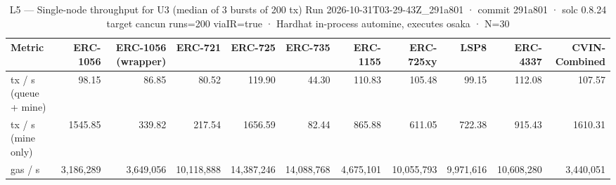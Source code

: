 \begin{table}[ht]
\centering
\small
\begin{tabular}{lrrrrrrrrrr}
\toprule
Metric & ERC-1056 & ERC-1056 (wrapper) & ERC-721 & ERC-725 & ERC-735 & ERC-1155 & ERC-725xy & LSP8 & ERC-4337 & CVIN-Combined \\
\midrule
tx / s (queue + mine) & 98.15 & 86.85 & 80.52 & 119.90 & 44.30 & 110.83 & 105.48 & 99.15 & 112.08 & 107.57 \\
tx / s (mine only) & 1545.85 & 339.82 & 217.54 & 1656.59 & 82.44 & 865.88 & 611.05 & 722.38 & 915.43 & 1610.31 \\
gas / s & 3,186,289 & 3,649,056 & 10,118,888 & 14,387,246 & 14,088,768 & 4,675,101 & 10,055,793 & 9,971,616 & 10,608,280 & 3,440,051 \\
\bottomrule
\end{tabular}
\caption{L5 — Single-node throughput for U3 (median of 3 bursts of 200 tx) Run 2026-10-31T03-29-43Z\_291a801 · commit 291a801 · solc 0.8.24 target cancun runs=200 viaIR=true · Hardhat in-process automine, executes osaka · N=30}
\label{tab:throughput}
\end{table}
